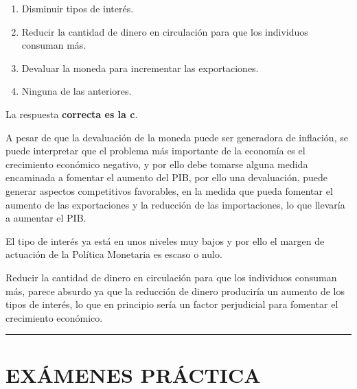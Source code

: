 \documentclass[
  letterpaper,
  DIV=11,
  numbers=noendperiod]{scrreprt}
\begin{document}
\begin{enumerate}
\def\labelenumi{\alph{enumi})}
\item
  Disminuir tipos de interés.
\item
  Reducir la cantidad de dinero en circulación para que los individuos
  consuman más.
\item
  Devaluar la moneda para incrementar las exportaciones.
\item
  Ninguna de las anteriores.
\end{enumerate}

\begin{tcolorbox}[enhanced jigsaw, left=2mm, opacityback=0, colback=white, breakable, arc=.35mm, bottomrule=.15mm, rightrule=.15mm, toprule=.15mm, leftrule=.75mm, colframe=quarto-callout-tip-color-frame]
\begin{minipage}[t]{5.5mm}
\textcolor{quarto-callout-tip-color}{\faLightbulb}
\end{minipage}%
\begin{minipage}[t]{\textwidth - 5.5mm}

La respuesta \textbf{correcta es la c}.

A pesar de que la devaluación de la moneda puede ser generadora de
inflación, se puede interpretar que el problema más importante de la
economía es el crecimiento económico negativo, y por ello debe tomarse
alguna medida encaminada a fomentar el aumento del PIB, por ello una
devaluación, puede generar aspectos competitivos favorables, en la
medida que pueda fomentar el aumento de las exportaciones y la reducción
de las importaciones, lo que llevaría a aumentar el PIB.

El tipo de interés ya está en unos niveles muy bajos y por ello el
margen de actuación de la Política Monetaria es escaso o nulo.

Reducir la cantidad de dinero en circulación para que los individuos
consuman más, parece absurdo ya que la reducción de dinero produciría un
aumento de los tipos de interés, lo que en principio sería un factor
perjudicial para fomentar el crecimiento económico.

\end{minipage}%
\end{tcolorbox}

\begin{center}\rule{0.5\linewidth}{0.5pt}\end{center}

\part{EXÁMENES PRÁCTICA}
\end{document}
